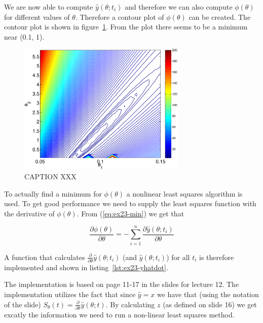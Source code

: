 

We are now able to compute $\hat{y}(\theta; t_i)$ and therefore we can also compute $\phi(\theta)$ for different values of $\theta$. Therefore a contour plot of $\phi(\theta)$ can be created. The contour plot is shown in figure~\ref{fig:ex23-contour}. From the plot there seems to be a minimum near (0.1, 1).

\begin{figure}[ht]
    \centering
    \includegraphics[width=80mm]{../media/ex23-contour.pdf}
    \caption{CAPTION XXX}
    \label{fig:ex23-contour}
\end{figure}

To actually find a minimum for $\phi(\theta)$ a nonlinear least squares algorithm is used. To get good performance we need to supply the least squares function with the derivative of $\phi(\theta)$. From (\ref{eq:ex23-min}) we get that 

\begin{equation*}
    \frac{\partial\phi(\theta)}{\partial\theta}=-\sum_{i=1}^n\frac{\partial\hat{y}(\theta; t_i)}{\partial\theta}
\end{equation*}

A function that calculates $\frac{\partial}{\partial\theta}\hat{y}(\theta;t_i)$ (and $\hat{y}(\theta;t_i)$) for all $t_i$ is therefore implemented and shown in listing~\ref{lst:ex23-yhatdot}.



The implementation is based on page 11-17 in the slides for lecture 12. The implementation utilizes the fact that since $\hat{y}=x$ we have that (using the notation of the slide) $S_\theta(t) = \frac{\partial}{\partial\theta}\hat{y}(\theta; t)$. By calculating $z$ (as defined on slide 16) we get excatly the information we need to run a non-linear least squares method.

